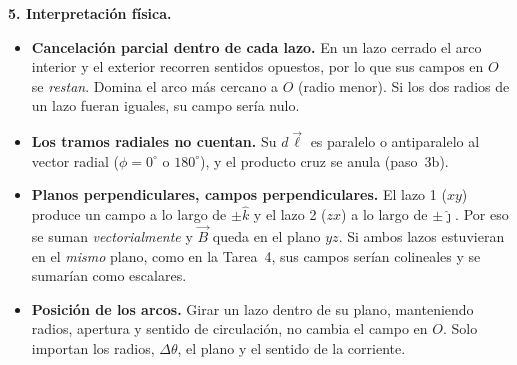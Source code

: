 \documentclass[12pt,letterpaper]{article}
\newcommand{\jj}{\hat{\jmath}}
\newcommand{\kk}{\hat{k}}
\begin{document}
\noindent\textbf{5. Interpretaci\'on f\'isica.}
\begin{itemize}\itemsep6pt
    \item \textbf{Cancelaci\'on parcial dentro de cada lazo.} En un lazo cerrado el arco interior y
    el exterior recorren sentidos opuestos, por lo que sus campos en $O$ se \emph{restan}. Domina el
    arco m\'as cercano a $O$ (radio menor). Si los dos radios de un lazo fueran iguales, su campo
    ser\'ia nulo.
    \item \textbf{Los tramos radiales no cuentan.} Su $d\vec{\ell}$ es paralelo o antiparalelo al
    vector radial ($\phi = 0^\circ$ o $180^\circ$), y el producto cruz se anula
    (paso~3b).
    \item \textbf{Planos perpendiculares, campos perpendiculares.} El lazo 1 ($xy$) produce un
    campo a lo largo de $\pm\kk$ y el lazo 2 ($zx$) a lo largo de $\pm\jj$. Por eso se suman
    \emph{vectorialmente} y $\vec{B}$ queda en el plano $yz$. Si ambos lazos estuvieran en el
    \emph{mismo} plano, como en la Tarea~4, sus campos ser\'ian colineales y se sumar\'ian como
    escalares.
    \item \textbf{Posici\'on de los arcos.} Girar un lazo dentro de su plano, manteniendo radios,
    apertura y sentido de circulaci\'on, no cambia el campo en $O$. Solo importan los radios,
    $\Delta\theta$, el plano y el sentido de la corriente.
\end{itemize}
\end{document}
